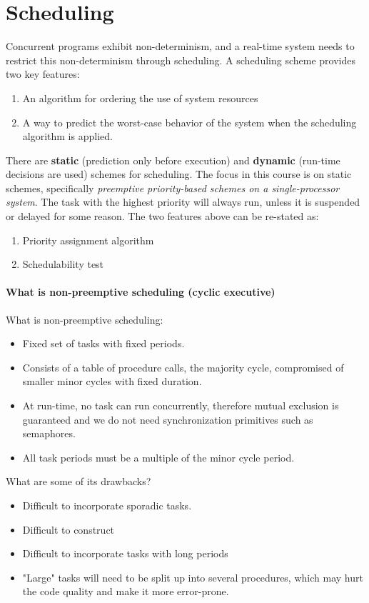 \part{Scheduling}
Concurrent programs exhibit non-determinism, and a real-time system needs to restrict this non-determinism through scheduling. A scheduling scheme provides two key features:
\begin{enumerate}
\item An algorithm for ordering the use of system resources
\item A way to predict the worst-case behavior of the system when the scheduling algorithm is applied.
\end{enumerate}

There are \textbf{static} (prediction only before execution) and \textbf{dynamic} (run-time decisions are used) schemes for scheduling. The focus in this course is on static schemes, specifically \textit{preemptive priority-based schemes on a single-processor system}. The task with the highest priority will always run, unless it is suspended or delayed for some reason. The two features above can be re-stated as:
\begin{enumerate}
\item Priority assignment algorithm
\item Schedulability test
\end{enumerate}

\subsection{What is non-preemptive scheduling (cyclic executive)}
What is non-preemptive scheduling:
\begin{itemize}
\item Fixed set of tasks with fixed periods. 
\item Consists of a table of procedure calls, the majority cycle, compromised of smaller minor cycles with fixed duration.
\item At run-time, no task can run concurrently, therefore mutual exclusion is guaranteed and we do not need synchronization primitives such as semaphores.
\item All task periods must be a multiple of the minor cycle period.
\end{itemize}
 
 What are some of its drawbacks?
 \begin{itemize}
 \item  Difficult to incorporate sporadic tasks.
\item Difficult to construct
\item Difficult to incorporate tasks with long periods
\item "Large" tasks will need to be split up into several procedures, which may hurt the code quality and make it more error-prone.
 \end{itemize}
 
